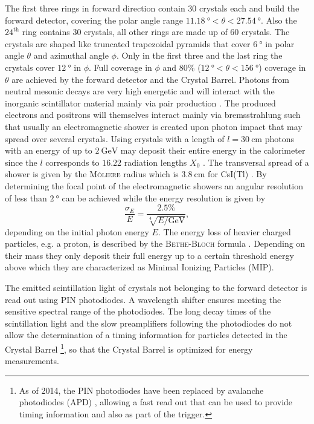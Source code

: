 \begin{figure}[htbp]
\end{figure} The first three rings in forward direction contain 30 crystals each and build the forward detector, covering the polar angle range $\SI{11.18}{\degree}<\theta<\SI{27.54}{\degree}$. Also the $24^\text{th}$ ring contains 30 crystals, all other rings are made up of 60 crystals. The crystals are shaped like truncated trapezoidal pyramids that cover $\SI{6}{\degree}$ in polar angle $\theta$ and azimuthal angle $\phi$. Only in the first three and the last ring the crystals cover $\SI{12}{\degree}$ in $\phi$. Full coverage in $\phi$ and $80\%$ ($\SI{12}{\degree}<\theta<\SI{156}{\degree}$) coverage in $\theta$ are achieved by the forward detector and the Crystal Barrel. Photons from neutral mesonic decays are very high energetic and will interact with the inorganic scintillator material mainly via pair production \cite{leo}. The produced electrons and positrons will themselves interact mainly via bremsstrahlung such that usually an electromagnetic shower is created upon photon impact that may spread over several crystals. Using crystals with a length of $l=\SI{30}{\centi\meter}$ photons with an energy of up to $\SI{2}{\giga\eV}$ may deposit their entire energy in the calorimeter since the $l$ corresponds to $16.22$ radiation lengths $X_0$ \cite{cbdet}. The transversal spread of a shower is given by the \textsc{M\'oliere} radius which is $\SI{3.8}{\centi\meter}$ for CsI(Tl) \cite{cbdet}. By determining the focal point of the electromagnetic showers an angular resolution of less than $\SI{2}{\degree}$ can be achieved \cite{cbang} while the energy resolution is given by \cite{cbdet}
\begin{equation}
	\frac{\sigma_E}{E}=\frac{2.5\%}{\sqrt[4]{E/\si{\giga\eV}}},
\end{equation}
depending on the initial photon energy $E$. The energy loss of heavier charged particles, e.g. a proton, is described by the \textsc{Bethe-Bloch} formula \cite{bethe}. Depending on their mass they only deposit their full energy up to a certain threshold energy above which they are characterized as Minimal Ionizing Particles (MIP).

The emitted scintillation light of crystals not belonging to the forward detector is read out using PIN photodiodes. A wavelength shifter ensures meeting the sensitive spectral range of the photodiodes. The long decay times of the scintillation light and the slow preamplifiers following the photodiodes do not allow the determination of a timing information for particles detected in the Crystal Barrel \footnote{As of 2014, the PIN photodiodes have been replaced by avalanche photodiodes (APD) \cite{honisch,urban}, allowing a fast read out that can be used to provide timing information and also as part of the trigger.}, so that the Crystal Barrel is optimized for energy measurements.

